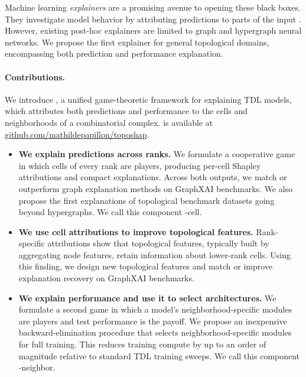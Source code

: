 Machine learning \emph{explainers} are a promising avenue to opening these black boxes. They investigate model behavior by attributing predictions to parts of the input \citep{doshivelez2017rigorous,ribeiro2016trust,lundberg2017shap}. However, existing post-hoc explainers are limited to graph \citep{sinha2025forge,ying2019gnnexplainer,luo2020parameterized,yuan2021subgraphx,muschalik2024graphshapiq} and hypergraph \citep{maleki2023hyperex,su2024shypx} neural networks. We propose the first explainer for general topological domains, encompassing both prediction and performance explanation. 

\paragraph{Contributions.}
We introduce \method, a unified game-theoretic framework for explaining TDL models, which attributes both predictions and performance to the cells and neighborhoods of a combinatorial complex. \method is available at \href{https://github.com/mathildepapillon/toposhap}{github.com/mathildepapillon/toposhap}.
\begin{itemize}[leftmargin=*]
\item \textbf{We explain predictions across ranks.} We formulate a cooperative game in which cells of every rank are players, producing per-cell Shapley attributions and compact explanations. Across both outputs, we match or outperform graph explanation methods on GraphXAI benchmarks. We also propose the first explanations of topological benchmark datasets going beyond hypergraphs. We call this component \method-cell.
\item \textbf{We use cell attributions to improve topological features.} Rank-specific attributions show that topological features, typically built by aggregating node features, retain information about lower-rank cells. Using this finding, we design new topological features and match or improve explanation recovery on GraphXAI benchmarks.
\item \textbf{We explain performance and use it to select architectures.} We formulate a second game in which a model's neighborhood-specific modules are players and test performance is the payoff. We propose an inexpensive backward-elimination procedure that selects neighborhood-specific modules for full training. This reduces training compute by up to an order of magnitude relative to standard TDL training sweeps. We call this component \method-neighbor.
\end{itemize}

